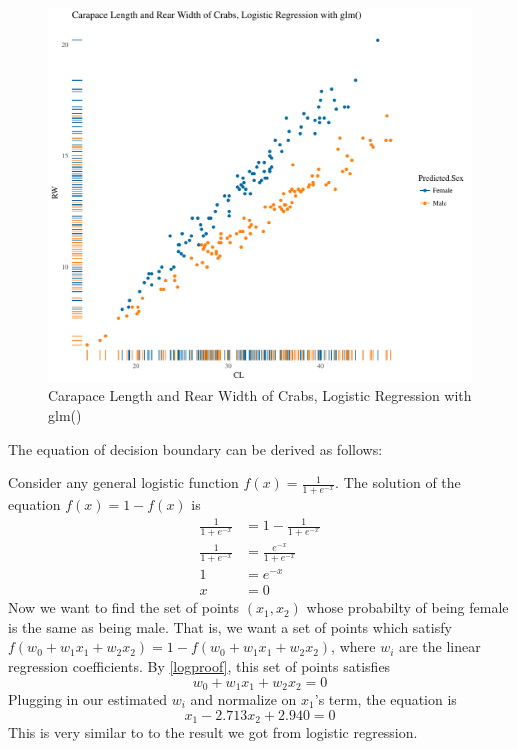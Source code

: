 \documentclass[11pt,english]{article}
\begin{document}
\begin{figure}[H]
  \centering
  \includegraphics[width = 1.13\textwidth]{glm.pdf}
  \caption{Carapace Length and Rear Width of
    Crabs, Logistic Regression with glm()}
  \label{glm}
\end{figure}

The equation of decision boundary can be derived as follows:

Consider any general logistic function $f(x) = \frac{1}{1+e^{-x}}$.
The solution of the equation $f(x) = 1 - f(x)$ is
\begin{align*}
  \frac{1}{1+e^{-x}} &= 1 - \frac{1}{1+e^{-x}}\\
  \frac{1}{1+e^{-x}} &= \frac{e^{-x}}{1+e^{-x}}\\
  1 &= e^{-x}\\
  x &= 0
\end{align*}\label{logproof}
Now we want to find the set of points $(x_1, x_2)$ whose probabilty
of being female is the same as being male. That is, we want a set of points
which satisfy $f(w_0 + w_1x_1 + w_2x_2) = 1 - f(w_0 + w_1x_1 + w_2x_2)$, where
$w_i$ are the linear regression coefficients. By \ref{logproof}, this set of
points satisfies
\begin{equation}
  w_0 + w_1x_1 + w_2x_2 = 0
\end{equation}
Plugging in our estimated $w_i$ and normalize on $x_1$'s term, the
equation is
\begin{equation}
  x_1 - 2.713x_2 + 2.940 = 0
\end{equation}
This is very similar to to the result we got from logistic regression.
\end{document}
